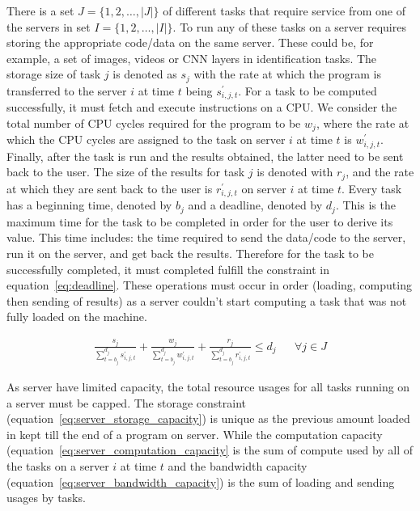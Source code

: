 There is a set $J = \{1,2,\ldots,\left| J \right|\}$ of  different tasks that require service from one of the servers
in set $I = \{1,2,\ldots, \left| I \right|\}$. To run any of these tasks on a server requires storing the appropriate
code/data on the same server. These could be, for example, a set of images, videos or CNN layers in identification
tasks. The storage size of task $j$ is denoted as $s_j$ with the rate at which the program is transferred to the server
$i$ at time $t$ being $s^{'}_{i,j,t}$. For a task to be computed successfully, it must fetch and execute instructions
on a CPU. We consider the total number of CPU cycles required for the program to be $w_j$, where the rate at which the
CPU cycles are assigned to the task on server $i$ at time $t$ is $w^{'}_{i,j,t}$. Finally, after the task is run and
the results obtained, the latter need to be sent back to the user. The size of the results for task $j$ is denoted with
$r_j$, and the rate at which they are sent back to the user is $r^{'}_{i,j,t}$ on server $i$ at time $t$. Every task
has a beginning time, denoted by $b_j$ and a deadline, denoted by $d_j$. This is the maximum time for the task to be
completed in order for the user to derive its value. This time includes: the time required to send the data/code to the
server, run it on the server, and get back the results. Therefore for the task to be successfully completed, it must
completed fulfill the constraint in equation~\eqref{eq:deadline}. These operations must occur in order (loading,
computing then sending of results) as a server couldn't start computing a task that was not fully loaded on the machine.

\begin{align}
    \frac{s_j}{\sum^{d_j}_{t=b_j} s^{'}_{i,j,t}} + \frac{w_j}{\sum^{d_j}_{t=b_j} w^{'}_{i,j,t}}  +
    \frac{r_j}{\sum^{d_j}_{t=b_j} r^{'}_{i,j,t}} \leq d_j && \forall{j \in J}  \label{eq:deadline}
\end{align}

As server have limited capacity, the total resource usages for all tasks running on a server must be capped.
The storage constraint (equation~\eqref{eq:server_storage_capacity}) is unique as the previous amount
loaded in kept till the end of a program on server. While the computation capacity
(equation~\eqref{eq:server_computation_capacity} is the sum of compute used by all of the tasks on a server $i$ at time $t$ and the
bandwidth capacity (equation~\eqref{eq:server_bandwidth_capacity}) is the sum of loading and sending usages by tasks.

